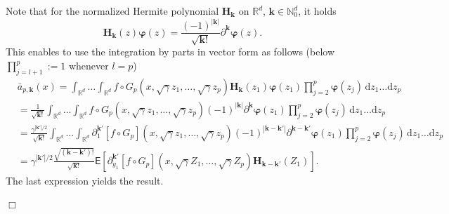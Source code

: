 \documentclass[bj]{imsart}
\def\rmd{\mathrm{d}}
\newcommand{\proofendsign}{$\Box$}
\newenvironment{proof}{{\noindent \bf Proof }}
 {{\hspace*{\fill}\proofendsign\par\bigskip}}
\begin{document}
\begin{proof}
Note that for the normalized Hermite polynomial $\mathbf H_{\mathbf k}$ on $\mathbb R^d$,
$\mathbf k\in\mathbb N_0^d$, it holds
$$
\mathbf{H}_{\mathbf{k}}(z)\boldsymbol{\varphi}(z)
=\frac{(-1)^{|\mathbf{k}|}}{\sqrt{\mathbf{k} !}} \partial^{\mathbf{k}} \boldsymbol{\varphi}(z).
$$
This enables to use the integration by parts in vector form as follows
(below $\prod_{j=l+1}^p:=1$ whenever $l=p$)
\begin{align*}
&\bar a_{p,\mathbf{k}}(x)
 =
\int_{\mathbb R^d}\ldots\int_{\mathbb R^d}
f\circ G_{p}(x,\sqrt{\gamma}z_{1},\ldots,\sqrt{\gamma}z_{p})
\mathbf{H}_{\mathbf{k}}(z_{1})\boldsymbol{\varphi}(z_1)
\prod_{j=2}^p\boldsymbol{\varphi}(z_j)\, \rmd z_{1}\ldots \rmd z_{p}
\\
& =
\frac{1}{\sqrt{\mathbf k!}}
\int_{\mathbb R^d}\ldots\int_{\mathbb R^d}
f\circ G_{p}(x,\sqrt{\gamma}z_{1},\ldots,\sqrt{\gamma}z_{p})
(-1)^{|\mathbf{k}|}\partial^{\mathbf{k}} \boldsymbol{\varphi}(z_1)
\prod_{j=2}^p\boldsymbol{\varphi}(z_j)\, \rmd z_{1}\ldots  \rmd z_{p}
\\
& =
\frac{\gamma^{|\mathbf k'|/2}}{\sqrt{\mathbf k!}}
\int_{\mathbb R^d}\ldots\int_{\mathbb R^d}
\partial_{1}^{\mathbf k'}[f\circ G_{p}](x,\sqrt{\gamma}z_{1},\ldots,\sqrt{\gamma}z_{p})
(-1)^{|\mathbf{k}-\mathbf k'|}\partial^{\mathbf{k}-\mathbf k'} \boldsymbol{\varphi}(z_1)
\prod_{j=2}^p\boldsymbol{\varphi}(z_j)\, \rmd z_{1}\ldots \rmd z_{p}
\\
 & =\gamma^{|\mathbf{k}'|/2}\frac{\sqrt{(\mathbf{k}-\mathbf{k}')!}}{\sqrt{\mathbf{k}!}}\mathsf{E}\left[\partial_{y_{1}}^{\mathbf{k}'}[f\circ G_{p}](x,\sqrt{\gamma}Z_{1},\ldots,\sqrt{\gamma}Z_{p})\mathbf{H}_{\mathbf{k}-\mathbf{k}'}(Z_{1})\right].
\end{align*}
The last expression yields the result.
\end{proof}
\end{document}
